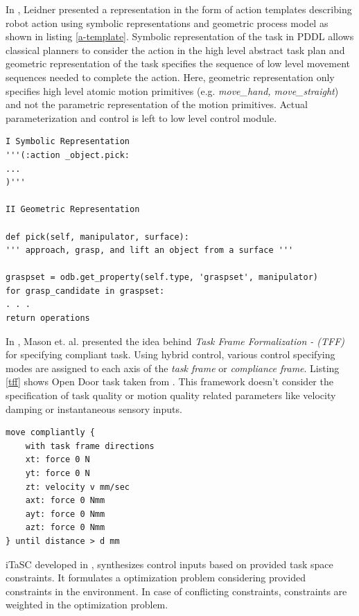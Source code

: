 \documentclass[thesis]{mas_proposal}
\begin{document}
In \cite{leidner2017cognitive}, Leidner presented a representation in the form of action templates describing robot action using symbolic representations and geometric process model as shown in listing \ref{a-template}.  Symbolic representation of the task in PDDL allows classical planners to consider the action in the high level abstract task plan and geometric representation of the task specifies the sequence of low level movement sequences needed to complete the action. Here, geometric representation only specifies high level atomic motion primitives (e.g. \textit{move\_hand, move\_straight}) and not the parametric representation of the motion primitives. Actual parameterization and control is left to low level control module.   

\begin{lstlisting}[label=a-template,caption=Action Template: \_object.pick]
I Symbolic Representation 
'''(:action _object.pick: 
...
)'''

II Geometric Representation

def pick(self, manipulator, surface):
''' approach, grasp, and lift an object from a surface '''

graspset = odb.get_property(self.type, 'graspset', manipulator) 
for grasp_candidate in graspset: 
. . .
return operations
\end{lstlisting}

In \cite{mason1981compliance}, Mason et. al. presented the idea behind \textit{Task Frame Formalization - (TFF)} for specifying compliant task. Using hybrid control, various control specifying modes are assigned to each axis of the \textit{task frame} or \textit{compliance frame}\cite{nagele2018prototype}. Listing \ref{tff} shows Open Door task taken from \cite{bruyninckx1996specification}. This framework doesn't consider the specification of task quality or motion quality related parameters like velocity damping or instantaneous sensory inputs. 
\begin{lstlisting}[label=tff,caption=Task Specification using TFF: Open Door]
move compliantly {
	with task frame directions
	xt: force 0 N
	yt: force 0 N
	zt: velocity v mm/sec
	axt: force 0 Nmm
	ayt: force 0 Nmm
	azt: force 0 Nmm
} until distance > d mm 
\end{lstlisting}


iTaSC developed in \cite{DeSchutter-ijrr2007, DecreBruyninckxDeSchutter2013, decre09}, synthesizes control inputs based on provided task space constraints. It formulates a optimization problem considering provided constraints in the environment. In case of conflicting constraints, constraints are weighted in the optimization problem. 
\end{document}

